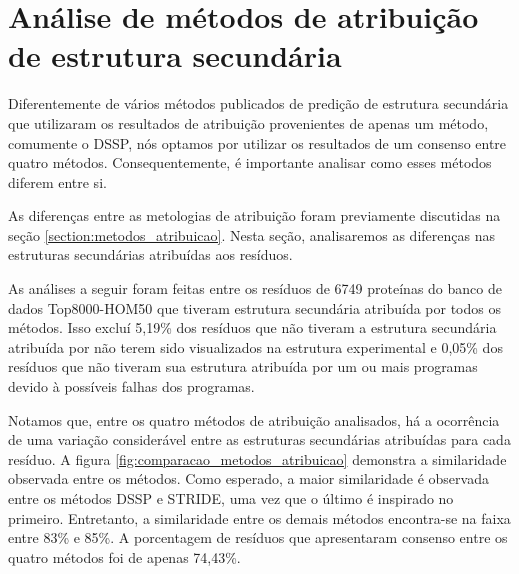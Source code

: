 \section{Análise de métodos de atribuição de estrutura secundária}

Diferentemente de vários métodos publicados de predição de estrutura secundária que utilizaram os resultados de atribuição provenientes de apenas um método, comumente o DSSP, nós optamos por utilizar os resultados de um consenso entre quatro métodos. Consequentemente, é importante analisar como esses métodos diferem entre si.

As diferenças entre as metologias de atribuição foram previamente discutidas na seção \ref{section:metodos_atribuicao}. Nesta seção, analisaremos as diferenças nas estruturas secundárias atribuídas aos resíduos.

As análises a seguir foram feitas entre os resíduos de 6749 proteínas do banco de dados Top8000-HOM50 que tiveram estrutura secundária atribuída por todos os métodos. Isso excluí 5,19\% dos resíduos que não tiveram a estrutura secundária atribuída por não terem sido visualizados na estrutura experimental e 0,05\% dos resíduos que não tiveram sua estrutura atribuída por um ou mais programas devido à possíveis falhas dos programas. 

Notamos que, entre os quatro métodos de atribuição analisados, há a ocorrência de uma variação considerável entre as estruturas secundárias atribuídas para cada resíduo. A figura \ref{fig:comparacao_metodos_atribuicao} demonstra a similaridade observada entre os métodos. Como esperado, a maior similaridade é observada entre os métodos DSSP e STRIDE, uma vez que o último é inspirado no primeiro. Entretanto, a similaridade entre os demais métodos encontra-se na faixa entre 83\% e 85\%. A porcentagem de resíduos que apresentaram consenso entre os quatro métodos foi de apenas 74,43\%.








